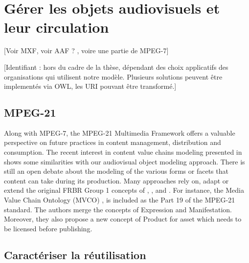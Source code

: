 \newpage
\section{Gérer les objets audiovisuels et leur circulation}\label{sec:gest}

[Voir MXF, voir AAF ? \cite{Cox2006}, voire une partie de MPEG-7]

[Identifiant : hors du cadre de la thèse, dépendant des choix applicatifs des organisations qui utilisent notre modèle. Plusieurs solutions peuvent être implementés via OWL, les URI pouvant être transformé.]

\subsection{MPEG-21}
Along with MPEG-7, the MPEG-21 Multimedia Framework \cite{Burnett2003} offers a valuable perspective on future practices in content management, distribution and consumption. The recent interest in content value chains modeling presented in \cite{Garcia2010} shows some similarities with our audiovisual object modeling approach. There is still an open debate about the modeling of the various forms or facets that content can take during its production. Many approaches rely on, adapt or extend the original FRBR Group 1 concepts of , ,  and . 
For instance, the Media Value Chain Ontology (MVCO) \cite{Rodriguez-Doncel2009}, \cite{Rodriguez-Doncel2010} is included as the Part 19 of the MPEG-21 standard. 
The authors merge the concepts of Expression and Manifestation. Moreover, they also propose a new concept of Product for asset which needs to be licensed before publishing. 




\subsection{Caractériser la réutilisation}\label{sec:reuse}

